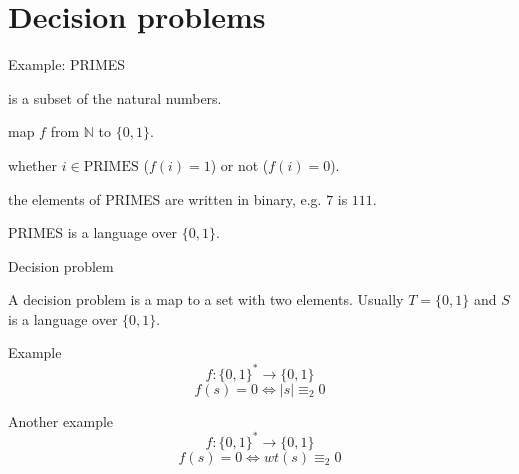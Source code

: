 \documentclass{beamer}
\begin{document}
\section{Decision problems}

\begin{frame}{Example: PRIMES}
  
    \begin{description}
      \setlength\itemsep{4mm}
      \item[PRIMES] is a subset of the natural numbers.
      \item[Decision problem:] map $f$ from $\mathbb{N}$ to $\{ 0, 1 \}$.
      \item[Indicates] whether $i \in \mathrm{PRIMES}$ ($f(i) = 1$) or not ($f(i) = 0$).
      \item[Stipulate] the elements of PRIMES are written in binary, e.g. $7$ is $111$.
      \item[Then] PRIMES is a language over $\{ 0, 1 \}$.
    \end{description} 
  
  \end{frame}
  
  
  
  \begin{frame}{Decision problem}
  
    A decision problem is a map to a set with two elements.
    Usually $T = \{ 0, 1 \}$ and $S$ is a language over $\{ 0, 1 \}$.
  
  
    \vspace{4mm}
    \begin{exampleblock}{Example}
      \[ f: \{0,1\}^* \rightarrow \{0,1\} \]
      \[ f(s) = 0 \Leftrightarrow |s| \equiv_2 0 \]
    \end{exampleblock}
  
    \vspace{4mm}
    \begin{exampleblock}{Another example}
     \[ f: \{0,1\}^* \rightarrow \{0,1\} \]
     \[ f(s) = 0 \Leftrightarrow wt(s) \equiv_2 0 \]
    \end{exampleblock}
  \end{frame}
  
\end{document}
